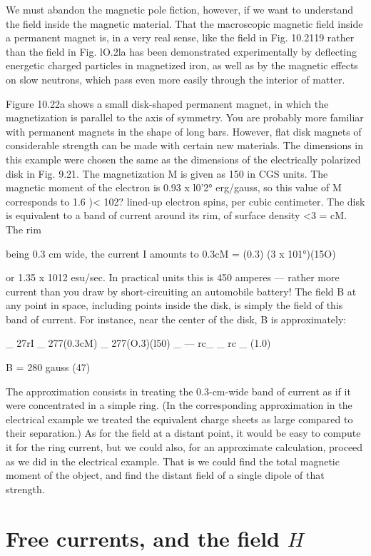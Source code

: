{{We must abandon the magnetic pole fiction, however, if we want
to understand the field inside the magnetic material. That the
macroscopic magnetic field inside a permanent magnet is, in a very
real sense, like the field in Fig. 10.2119 rather than the field in
Fig. lO.2la has been demonstrated experimentally by deflecting
energetic charged particles in magnetized iron, as well as by the magnetic
effects on slow neutrons, which pass even more easily through
the interior of matter.

Figure 10.22a shows a small disk-shaped permanent magnet, in
which the magnetization is parallel to the axis of symmetry. You
are probably more familiar with permanent magnets in the shape of
long bars. However, flat disk magnets of considerable strength can
be made with certain new materials. The dimensions in this example
were chosen the same as the dimensions of the electrically polarized
disk in Fig. 9.21. The magnetization M is given as 150 in
CGS units. The magnetic moment of the electron is 0.93 x l0'2°
erg/gauss, so this value of M corresponds to 1.6 )< 102? lined-up
electron spins, per cubic centimeter. The disk is equivalent to a
band of current around its rim, of surface density <3 = cM. The rim

being 0.3 cm wide, the current I amounts to
0.3cM = (0.3) (3 x 101°)(15O)

or 1.35 x 1012 esu/sec. In practical units this is 450 amperes --- 
rather more current than you draw by short-circuiting an automobile
battery! The field B at any point in space, including points inside
the disk, is simply the field of this band of current. For instance,
near the center of the disk, B is approximately:

_ 27rI _ 277(0.3cM) _ 277(O.3)(l50)
_  --- rc_ _ rc _ (1.0)

B = 280 gauss (47)

The approximation consists in treating the 0.3-cm-wide band of 
current as if it were concentrated in a simple ring. (In the corresponding
approximation in the electrical example we treated the equivalent
charge sheets as large compared to their separation.) As for
the field at a distant point, it would be easy to compute it for the
ring current, but we could also, for an approximate calculation,
proceed as we did in the electrical example. That is we could find
the total magnetic moment of the object, and find the distant field
of a single dipole of that strength.

\section{Free currents, and the field $H$}

}}
